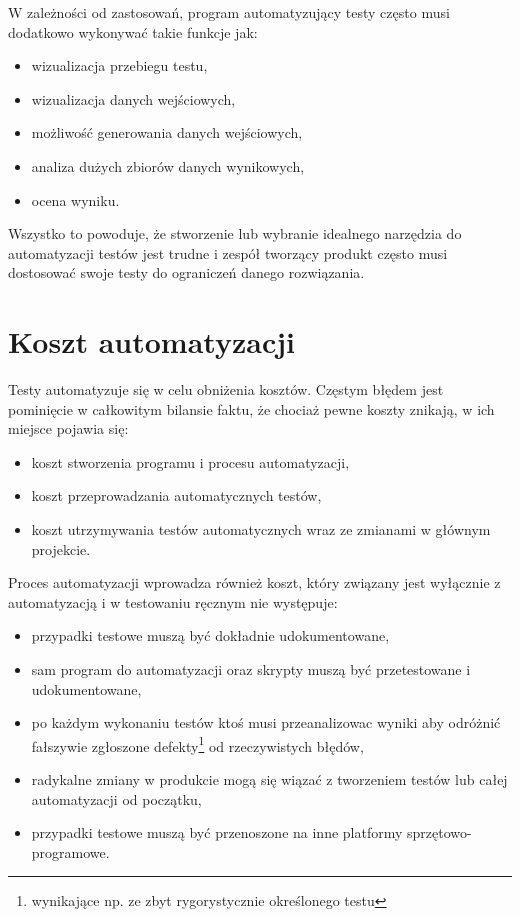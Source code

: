 \documentclass[00-praca-magisterska.tex]{subfiles}
\begin{document}
W zależności od zastosowań, program automatyzujący testy często musi dodatkowo
wykonywać takie funkcje jak:
\begin{itemize}
\item wizualizacja przebiegu testu,
\item wizualizacja danych wejściowych,
\item możliwość generowania danych wejściowych,
\item analiza dużych zbiorów danych wynikowych,
\item ocena wyniku.
\end{itemize}

Wszystko to powoduje, że stworzenie lub wybranie idealnego narzędzia do
automatyzacji testów jest trudne i zespół tworzący produkt często musi
dostosować swoje testy do ograniczeń danego rozwiązania.

\section{Koszt automatyzacji}
\label{koszt-automatyzacji}

Testy automatyzuje się w celu obniżenia kosztów. Częstym błędem jest pominięcie
w całkowitym bilansie faktu, że chociaż pewne koszty znikają, w ich miejsce
pojawia się:
\begin{itemize}
\item koszt stworzenia programu i procesu automatyzacji,
\item koszt przeprowadzania automatycznych testów,
\item koszt utrzymywania testów automatycznych wraz ze zmianami w głównym
projekcie.
\end{itemize}

Proces automatyzacji wprowadza również koszt, który związany jest wyłącznie z
automatyzacją i w testowaniu ręcznym nie występuje:
\begin{itemize}
\item przypadki testowe muszą być dokładnie udokumentowane,
\item sam program do automatyzacji oraz skrypty muszą być przetestowane i
udokumentowane,
\item po każdym wykonaniu testów ktoś musi przeanalizowac wyniki aby odróżnić
fałszywie zgłoszone defekty\footnote{wynikające np. ze zbyt rygorystycznie
określonego testu} od rzeczywistych błędów,
\item radykalne zmiany w produkcie mogą się wiązać z tworzeniem testów lub
całej automatyzacji od początku,
\item przypadki testowe muszą być przenoszone na inne platformy
sprzętowo-programowe.
\end{itemize}
\end{document}
